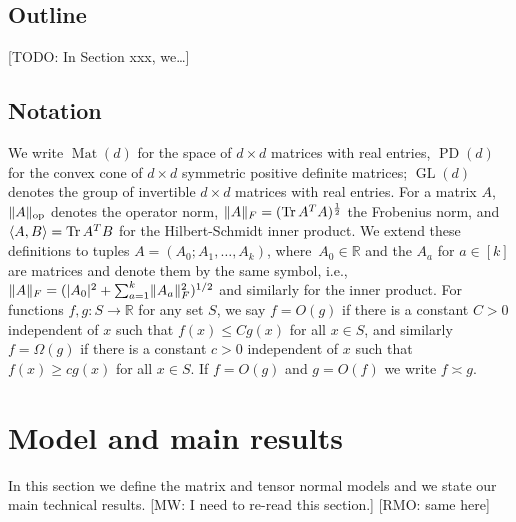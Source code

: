\documentclass[aos]{imsart}
\theoremstyle{definition}
\numberwithin{equation}{section}
\DeclareMathOperator{\op}{op}
\DeclareMathOperator{\Mat}{Mat}
\DeclareMathOperator{\GL}{GL}
\DeclareMathOperator{\tr}{Tr}
\DeclareMathOperator{\PD}{PD}
\DeclarePairedDelimiter{\abs}{\lvert}{\rvert}
\DeclarePairedDelimiter{\norm}{\lVert}{\rVert}
\newcommand{\R}{{\mathbb{R}}}
\newcommand{\RMO}[1]{{\color{olive}[RMO: #1]}}
\newcommand{\MW}[1]{{\color{red}[MW: #1]}}
\newcommand{\TODO}[1]{{\color{blue}[TODO: #1]}}
\begin{document}

\subsection{Outline}
\TODO{In Section xxx, we\dots}

\subsection{Notation}
We write $\Mat(d)$ for the space of $d\times d$ matrices with real entries, $\PD(d)$ for the convex cone of $d\times d$ symmetric positive definite matrices; $\GL(d)$ denotes the group of invertible $d\times d$ matrices with real entries.
For a matrix $A$, $\norm{A}_{\op}$ denotes the operator norm, $\norm{A}_F = (\tr A^T A)^{\frac12}$ the Frobenius norm, and $\braket{A,B} = \tr A^T B$ for the Hilbert-Schmidt inner product.
We extend these definitions to tuples $A=(A_0;A_1,\dots,A_k)$, where~$A_0\in\R$ and the $A_a$ for $a\in[k]$ are matrices and denote them by the same symbol, i.e., $\norm{A}_F = (\abs{A_0}^2 + \sum_{a=1}^k \norm{A_a}_F^2)^{1/2}$ and similarly for the inner product. For functions $f,g:S \to \R$ for any set $S$, we say $f = O(g)$ if there is a constant $C > 0$ independent of $x$ such that $f(x) \leq C g(x)$ for all $x \in S$, and similarly $f = \Omega(g)$ if there is a constant $c > 0$ independent of $x$ such that $f(x) \geq c g(x)$ for all $x \in S$. If $f = O(g)$ and $g = O(f)$ we write $f \asymp g$.

\section{Model and main results}\label{sec:main results}
In this section we define the matrix and tensor normal models and we state our main technical results.
\MW{I need to re-read this section.}
\RMO{same here}
\end{document}
